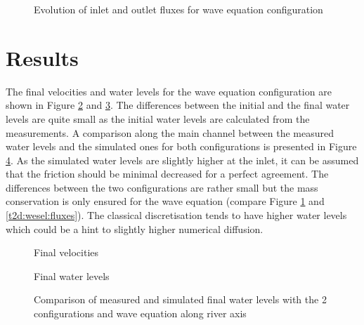 \begin{figure} [h!]
\centering
{}
\caption{Evolution of inlet and outlet fluxes for wave equation configuration}
\label{t2d:wesel:fluxes_pos}
\end{figure}


\section{Results}

The final velocities and water levels for the wave equation configuration are
shown in Figure \ref{t2d:wesel:velocity} and \ref{t2d:wesel:free_surface}.
The differences between the initial and the final water levels are quite small
as the initial water levels are calculated from the measurements.
A comparison along the main channel between the measured water levels and the
simulated ones for both configurations is presented in Figure
\ref{t2d:wesel:diff_waterlevels}.
As the simulated water levels are slightly higher at the inlet, it can be
assumed that the friction should be minimal decreased for a perfect agreement.
The differences between the two configurations are rather small but the mass
conservation is only ensured for the wave equation
(compare Figure \ref{t2d:wesel:fluxes_pos} and \ref{t2d:wesel:fluxes}).
The classical discretisation tends to have higher water levels which could be a
hint to slightly higher numerical diffusion. 


\begin{figure} [h!]
\centering
{}
\caption{Final velocities}
\label{t2d:wesel:velocity}
\end{figure}

\begin{figure} [h!]
\centering
{}
\caption{Final water levels}
\label{t2d:wesel:free_surface}
\end{figure}

\begin{figure} [h!]
\centering
{}
\caption{Comparison of measured and simulated final water levels with the 2 configurations and wave equation along river axis}
\label{t2d:wesel:diff_waterlevels}
\end{figure}

